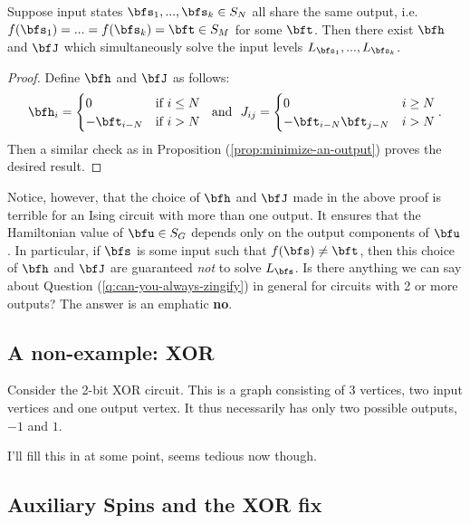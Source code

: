 \documentclass[raggedright, nofonts, notitlepage, openany, debug]{tufte-book}
\begin{document}
\begin{prop}\label{prop:minimize-an-output}
  Suppose input states $\bfs_1,...,\bfs_k\in S_N$ all share the same output, i.e. $f(\bfs_1) = ... = f(\bfs_k) = \bft \in S_M$ for some $\bft$. Then there exist $\bfh$ and $\bfJ$ which simultaneously solve the input levels $L_{\bfs_1},...,L_{\bfs_k}$.
\end{prop}
\begin{proof}
  Define $\bfh$ and $\bfJ$ as follows:
  \begin{align*}
    \bfh_i =
    \begin{cases}
      0 & \text{if } i \leq N \\
      -\bft_{i - N} & \text{if } i > N
    \end{cases} ~\text{ and } ~
    J_{ij} =
    \begin{cases}
      0 & i \geq N \\
      -\bft_{i - N}\bft_{j - N} & i > N
    \end{cases}.
  \end{align*}
  Then a similar check as in Proposition (\ref{prop:minimize-an-output}) proves the desired result.
\end{proof}
Notice, however, that the choice of $\bfh$ and $\bfJ$ made in the above proof is terrible for an Ising circuit with more than one output. It ensures that the Hamiltonian value of $\bfu \in S_G$ depends only on the output components of $\bfu$. In particular, if $\bfs$ is some input such that $f(\bfs) \neq \bft$, then this choice of $\bfh$ and $\bfJ$ are guaranteed \emph{not} to solve $L_{\bfs}$. Is there anything we can say about Question (\ref{q:can-you-always-zingify}) in general for circuits with 2 or more outputs? The answer is an emphatic \textbf{no}.

\subsection{A non-example: XOR}
Consider the 2-bit XOR circuit. This is a graph consisting of 3 vertices, two input vertices and one output vertex. It thus necessarily has only two possible outputs, $-1$ and $1$. 

I'll fill this in at some point, seems tedious now though.

\subsection{Auxiliary Spins and the XOR fix}
\end{document}

